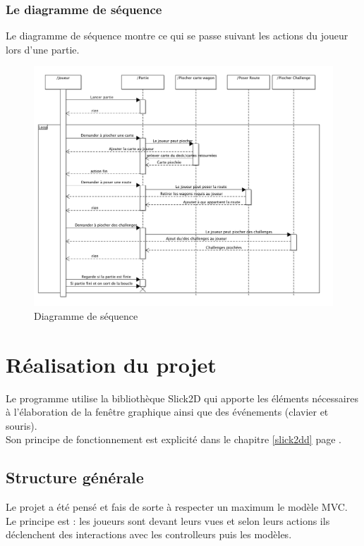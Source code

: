 \documentclass{report}
\begin{document}
\subsection{Le diagramme de séquence}
Le diagramme de séquence montre ce qui se passe suivant les actions du joueur lors d'une partie.
\begin{figure}[H]
\center
\includegraphics[width=500pt]{diagSeq.png}
\caption{Diagramme de séquence}
\label{diagSeq}
\end{figure}


\chapter{Réalisation du projet}
Le programme utilise la bibliothèque Slick2D qui apporte les éléments nécessaires à l'élaboration de la fenêtre graphique ainsi que des événements (clavier et souris).\\
Son principe de fonctionnement est explicité dans le chapitre \ref{slick2dd} page \pageref{slick2dd}.
\section{Structure générale}
Le projet a été pensé et fais de sorte à respecter un maximum le modèle MVC.\\
Le principe est : les joueurs sont devant leurs vues et selon leurs actions ils déclenchent des interactions avec les controlleurs puis les modèles.
\end{document}
